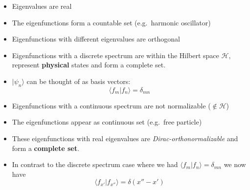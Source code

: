 \begin{itemize}
    \item Eigenvalues are real
    \item The eigenfunctions form a countable set (e.g.\ harmonic oscillator)
    \item Eigenfunctions with different eigenvalues are orthogonal
    \item Eigenfunctions with a discrete spectrum are within the Hilbert space $\mathcal{H}$, represent \textbf{physical} states and form a complete set.
    \item $|\psi_n\rangle$ can be thought of as basis vectors:
        \noindent\begin{equation*}
            \langle f_m|f_n\rangle=\delta_{mn}
        \end{equation*}
\end{itemize}


\begin{itemize}
    \item Eigenfunctions with a continuous spectrum are not normalizable ($\notin \mathcal{H}$)
    \item The eigenfunctions appear as continuous set (e.g.\ free particle)
    \item These eigenfunctions with real eigenvalues are \textit{Dirac-orthonormalizable} and form a \textbf{complete set}.
    \item In contrast to the discrete spectrum case where we had $\langle f_m|f_n\rangle=\delta_{mn}$ we now have
          \noindent\begin{equation*}
              \langle f_{x'}|f_{x''}\rangle=\delta(x''-x')
          \end{equation*}
\end{itemize}

